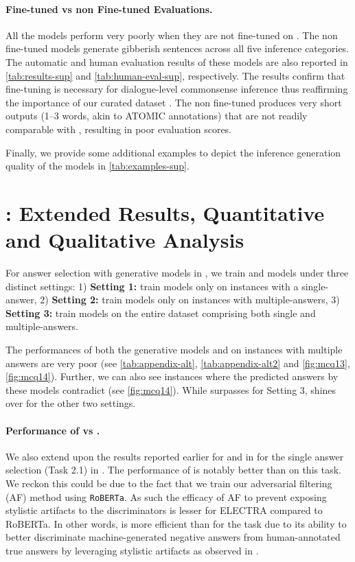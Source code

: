 \paragraph{Fine-tuned vs non Fine-tuned Evaluations.}
All the models perform very poorly when they are not fine-tuned on \dataset{}.
The non fine-tuned models generate gibberish sentences across all five inference categories. The automatic and human evaluation results of these models are also reported in \cref{tab:results-sup} and \cref{tab:human-eval-sup}, respectively. 
The results confirm that fine-tuning is necessary for dialogue-level commonsense inference thus reaffirming the importance of our curated dataset \dataset{}. The non fine-tuned  produces very short outputs (1--3 words, akin to ATOMIC annotations) that are not readily comparable with \dataset{}, resulting in poor evaluation scores.

Finally, we provide some additional examples to depict the inference generation quality of the models in \cref{tab:examples-sup}.

\section{\dataset{}: Extended Results, Quantitative and Qualitative Analysis}
\label{sec:appendix-alt}
For answer selection with generative models in \dataset{}, we train  and  models under three distinct settings: 1) \textbf{Setting 1:} train models only on instances with a single-answer, 2) \textbf{Setting 2:} train models only on instances with multiple-answers, 3) \textbf{Setting 3:} train models on the entire dataset comprising both single and multiple-answers. 

The performances of both the generative models  and  on instances with multiple answers are very poor (see \cref{tab:appendix-alt}, \cref{tab:appendix-alt2} and \cref{fig:mcq13}, \cref{fig:mcq14}). Further, we can also see instances where the predicted answers by these models contradict (see \cref{fig:mcq14}). While  surpasses  for Setting 3,  shines over  for the other two settings. 

\paragraph{Performance of  vs .}
We also extend upon the results reported earlier for  and  in  for the single answer selection (Task 2.1) in \dataset{}. The performance of  is notably better than  on this task. We reckon this could be due to the fact that we train our adversarial filtering (AF) method using \texttt{RoBERTa}. As such the efficacy of AF to prevent exposing stylistic artifacts to the discriminators is lesser for ELECTRA compared to RoBERTa. In other words,  is more efficient than  for the \dataset{} task due to its ability to better discriminate machine-generated negative answers from human-annotated true answers by leveraging stylistic artifacts as observed in \citet{zellers2018swag}.

